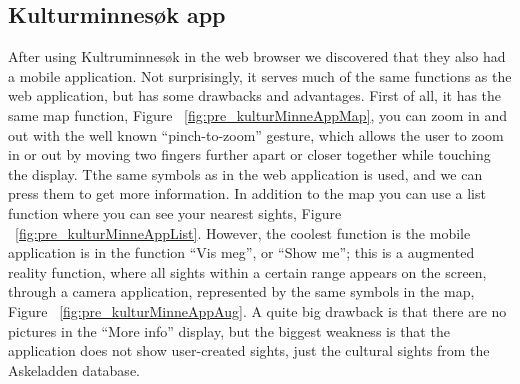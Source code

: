 \documentclass[11pt]{book}
\begin{document}
\subsection{Kulturminnesøk app}
After using Kultruminnesøk in the web browser we discovered that they also had a mobile application. Not surprisingly, it serves much of the same functions as the web application, but has some drawbacks and  advantages. First of all, it has the same map function, Figure ~\ref{fig:pre_kulturMinneAppMap}, you can zoom in and out with the well known “pinch-to-zoom” gesture, which allows the user to zoom in or out by moving two fingers further apart or closer together while touching the display. Tthe same symbols as in the web application is used, and we can press them to get more information. In addition to the map you can use a list function where you can see your nearest sights, Figure ~\ref{fig:pre_kulturMinneAppList}. However, the coolest function is the mobile application is in the function “Vis meg”, or “Show me”; this is a augmented reality function, where all sights within a certain range appears on the screen, through a camera application, represented by the same symbols in the map, Figure ~\ref{fig:pre_kulturMinneAppAug}.  A quite big drawback is that there are no pictures in the “More info” display, but the biggest weakness is that the application does not show user-created sights, just the cultural sights from the Askeladden database.
\end{document}
